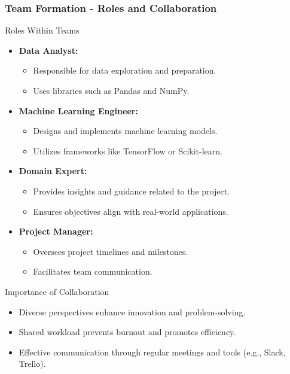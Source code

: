 \documentclass{beamer}
\begin{document}
\begin{frame}[fragile]
    \frametitle{Team Formation - Roles and Collaboration}
    \begin{block}{Roles Within Teams}
        \begin{itemize}
            \item \textbf{Data Analyst:} 
                \begin{itemize}
                    \item Responsible for data exploration and preparation.
                    \item Uses libraries such as Pandas and NumPy.
                \end{itemize}
            \item \textbf{Machine Learning Engineer:} 
                \begin{itemize}
                    \item Designs and implements machine learning models.
                    \item Utilizes frameworks like TensorFlow or Scikit-learn.
                \end{itemize}
            \item \textbf{Domain Expert:} 
                \begin{itemize}
                    \item Provides insights and guidance related to the project.
                    \item Ensures objectives align with real-world applications.
                \end{itemize}
            \item \textbf{Project Manager:} 
                \begin{itemize}
                    \item Oversees project timelines and milestones.
                    \item Facilitates team communication.
                \end{itemize}
        \end{itemize}
    \end{block}

    \begin{block}{Importance of Collaboration}
        \begin{itemize}
            \item Diverse perspectives enhance innovation and problem-solving.
            \item Shared workload prevents burnout and promotes efficiency.
            \item Effective communication through regular meetings and tools (e.g., Slack, Trello).
        \end{itemize}
    \end{block}
\end{frame}
\end{document}
